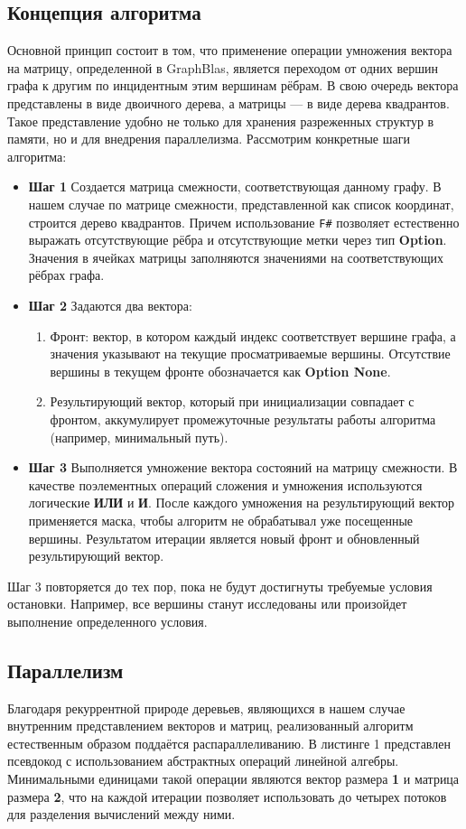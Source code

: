 \subsection{Концепция алгоритма}
Основной принцип состоит в том, что применение операции умножения вектора на матрицу, определенной в GraphBlas, является переходом от одних вершин графа к другим по инцидентным этим вершинам рёбрам.
В свою очередь вектора представлены в виде двоичного дерева, а матрицы --- в виде дерева квадрантов. Такое представление удобно не только для хранения разреженных структур в памяти, но и для внедрения параллелизма. Рассмотрим конкретные шаги алгоритма:
\begin{itemize}
    \item \textbf{Шаг 1} Создается матрица смежности, соответствующая данному графу. В нашем случае по матрице смежности, представленной как список координат, строится дерево квадрантов. Причем использование \texttt{F\#} позволяет естественно выражать отсутствующие рёбра и отсутствующие метки через тип \textbf{Option}. Значения в ячейках матрицы заполняются значениями на соответствующих рёбрах графа.
    \item \textbf{Шаг 2} Задаются два вектора:
    \begin{enumerate}
        \item Фронт: вектор, в котором каждый индекс соответствует вершине графа, а значения указывают на текущие просматриваемые вершины. Отсутствие вершины в текущем фронте обозначается как \textbf{Option None}.
        \item Результирующий вектор, который при инициализации совпадает с фронтом, аккумулирует промежуточные результаты работы алгоритма (например, минимальный путь).
    \end{enumerate}
    \item \textbf{Шаг 3} Выполняется умножение вектора состояний на матрицу смежности. В качестве поэлементных операций сложения и умножения используются логические \textbf{ИЛИ} и \textbf{И}. После каждого умножения на результирующий вектор применяется маска, чтобы алгоритм не обрабатывал уже посещенные вершины. Результатом итерации является новый фронт и обновленный результирующий вектор.
\end{itemize}
Шаг 3 повторяется до тех пор, пока не будут достигнуты требуемые условия остановки. Например, все вершины станут исследованы или произойдет выполнение определенного условия.

\subsection{Параллелизм}
Благодаря рекуррентной природе деревьев, являющихся в нашем случае внутренним представлением векторов и матриц, реализованный алгоритм естественным образом поддаётся распараллеливанию. В листинге 1 представлен псевдокод с использованием абстрактных операций линейной алгебры. Минимальными единицами такой операции являются вектор размера \textbf{1} и матрица размера \textbf{2}, что на каждой итерации позволяет использовать до четырех потоков для разделения вычислений между ними.

